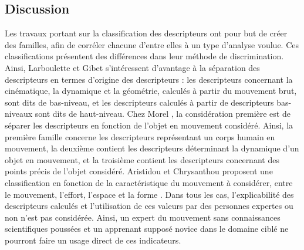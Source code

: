 

\subsection{Discussion}
Les travaux portant sur la classification des descripteurs ont pour but de créer des familles, afin de corréler chacune d'entre elles à un type d'analyse voulue. Ces classifications présentent des différences dans leur méthode de discrimination. Ainsi, Larboulette et Gibet \parencite{larboulette2015Descriptors} s'intéressent d'avantage à la séparation des descripteurs en termes d'origine des descripteurs : les descripteurs concernant la cinématique, la dynamique et la géométrie, calculés à partir du mouvement brut, sont dits de bas-niveau, et les descripteurs calculés à partir de descripteurs bas-niveaux sont dits de haut-niveau. Chez Morel \cite{Morel2017Mts}, la considération première est de séparer les descripteurs en fonction de l'objet en mouvement considéré. Ainsi, la première famille concerne les descripteurs représentant un corps humain en mouvement, la deuxième contient les descripteurs déterminant la dynamique d'un objet en mouvement, et la troisième contient les descripteurs concernant des points précis de l'objet considéré. Aristidou et Chrysanthou proposent une classification en fonction de la caractéristique du mouvement à considérer, entre le mouvement, l'effort, l'espace et la forme \parencite{Aristidou2014Fef}. Dans tous les cas, l'explicabilité des descripteurs calculés et l'utilisation de ces valeurs par des personnes expertes ou non n'est pas considérée. Ainsi, un expert du mouvement sans connaissances scientifiques poussées et un apprenant supposé novice dans le domaine ciblé ne pourront faire un usage direct de ces indicateurs.

